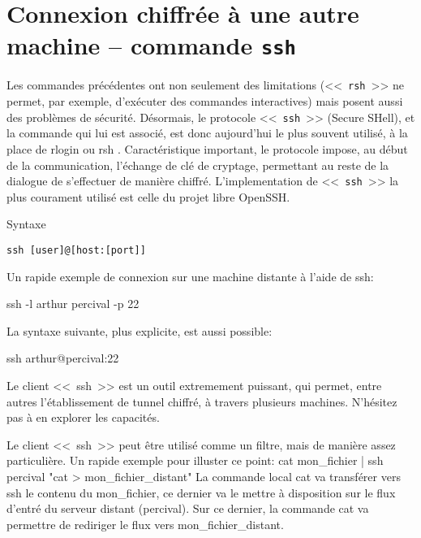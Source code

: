 
\section{Connexion chiffr{\'e}e {\`a} une autre machine -- commande {\tt ssh}}
Les commandes précédentes ont non seulement des limitations (<<~{\tt rsh}~>> ne permet, par exemple, d'exécuter des commandes interactives) mais posent aussi des problèmes de sécurité. Désormais, le protocole <<~\texttt{ssh}~>> (Secure SHell), et la commande qui lui est associé, est donc aujourd'hui le plus souvent utilisé, à la place de rlogin ou rsh .
Caractéristique important, le protocole impose, au début de la communication, l'échange de clé de cryptage, permettant au reste de la dialogue de s'effectuer de manière chiffré.
L'implementation de <<~{\tt ssh}~>> la plus courament utilisé est celle du projet libre OpenSSH.
\begin{definition}{Syntaxe}
\begin{verbatim}
ssh [user]@[host:[port]]
\end{verbatim}
\end{definition}
Un rapide exemple de connexion sur une machine distante à l'aide de ssh:

ssh -l arthur percival -p 22

La syntaxe suivante, plus explicite, est aussi possible:

ssh arthur@percival:22 

\begin{remarque}
Le client <<~{ssh}~>> est un outil extremement puissant, qui permet, entre autres l'établissement de tunnel chiffré, à travers plusieurs machines. N'hésitez pas à en explorer les capacités. 
\end{remarque}

\begin{remarque}
Le client <<~{ssh}~>> peut être utilisé comme un filtre, mais de manière assez particulière. Un rapide exemple pour illuster ce point:
cat mon_fichier | ssh percival "cat > mon_fichier_distant" 
La commande local cat va transférer vers ssh le contenu du mon_fichier, ce dernier va le mettre à disposition sur le flux d'entré du serveur distant (percival). Sur ce dernier, la commande cat va permettre de rediriger le flux vers mon_fichier_distant. 
\end{remarque}

